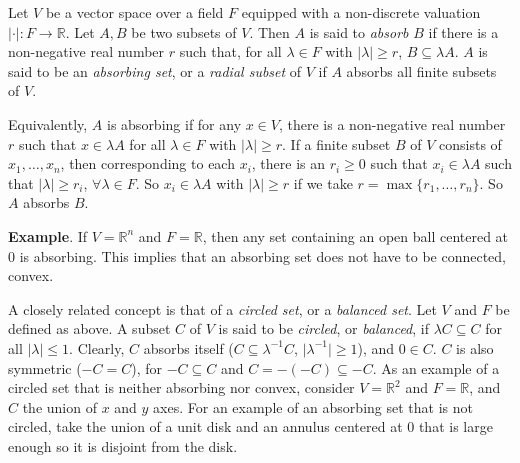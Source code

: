 \documentclass[12pt]{article}
\newcommand{\abs}[1]{\vert{#1}\vert}
\begin{document}

Let $V$ be a vector space over a field $F$ equipped with a
non-discrete valuation $\abs{\cdot}:F\to\mathbb{R}$.  Let $A,B$ be
two subsets of $V$.  Then $A$ is said to \emph{absorb} $B$ if there
is a non-negative real number $r$ such that, for all $\lambda\in F$
with $\abs{\lambda}\geq r$, $B\subseteq\lambda A$.  $A$ is said to
be an \emph{absorbing set}, or a \emph{radial subset} of $V$ if $A$
absorbs all finite subsets of $V$.

Equivalently, $A$ is absorbing if for any $x\in V$, there is a
non-negative real number $r$ such that $x\in\lambda A$ for all
$\lambda\in F$ with $\abs{\lambda}\geq r$.  If a finite subset $B$
of $V$ consists of $x_1,\ldots,x_n$, then corresponding to each
$x_i$, there is an $r_i\geq 0$ such that $x_i\in\lambda A$ such that
$\vert\lambda\mid\geq r_i$, $\forall\lambda\in F$.  So
$x_i\in\lambda A$ with $\abs{\lambda}\geq r$ if we take
$r=\max\lbrace r_1,\ldots,r_n\rbrace$.  So $A$ absorbs $B$.

\textbf{Example}. If $V=\mathbb{R}^n$ and $F=\mathbb{R}$, then any
set containing an open ball centered at $0$ is absorbing. This
implies that an absorbing set does not have to be connected, convex.

A closely related concept is that of a \emph{circled set}, or a \emph{balanced set}. Let $V$ and $F$ be defined as above.  A subset $C$ of $V$ is said to be
\emph{circled}, or \emph{balanced}, if $\lambda C\subseteq C$ for all $\abs{\lambda}\leq 1$.  Clearly, $C$ absorbs itself ($C\subseteq\lambda^{-1}C$,
$\abs{\lambda^{-1}}\geq 1$), and $0\in C$. $C$ is also symmetric
($-C=C$), for $-C\subseteq C$ and $C=-(-C)\subseteq -C$. As an
example of a circled set that is neither absorbing nor convex,
consider $V=\mathbb{R}^2$ and $F=\mathbb{R}$, and $C$ the union of
$x$ and $y$ axes.  For an example of an absorbing set that is not
circled, take the union of a unit disk and an annulus centered at 0
that is large enough so it is disjoint from the disk.
\end{document}
